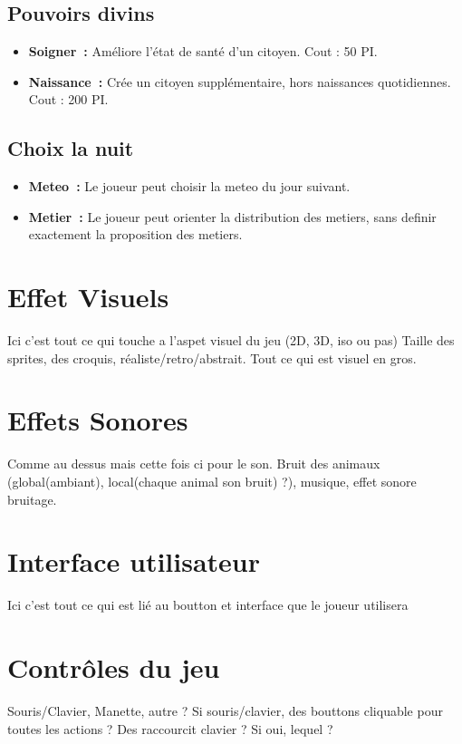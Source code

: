 \documentclass[a4paper]{article}
\begin{document}
\subsection*{Pouvoirs divins}
\begin{itemize}
\item \textbf{Soigner :} \small{ Améliore l'état de santé d'un citoyen. Cout : 50 PI.}
\item \textbf{Naissance :} \small{ Crée un citoyen supplémentaire, hors naissances quotidiennes. Cout : 200 PI.}
\end{itemize}

\subsection*{Choix la nuit}
\begin{itemize}
\item \textbf{Meteo :} \small{ Le joueur peut choisir la meteo du jour suivant.}
\item \textbf{Metier :} \small{ Le joueur peut orienter la distribution des metiers, sans definir exactement la proposition des metiers.}
\end{itemize}


\section*{Effet Visuels}

Ici c'est tout ce qui touche a l'aspet visuel du jeu (2D, 3D, iso ou pas) Taille des sprites, des croquis, réaliste/retro/abstrait. Tout ce qui est visuel en gros.

\section*{Effets Sonores}

Comme au dessus mais cette fois ci pour le son. Bruit des animaux (global(ambiant), local(chaque animal son bruit) ?), musique, effet sonore bruitage.

\section*{Interface utilisateur}

Ici c'est tout ce qui est lié au boutton et interface que le joueur utilisera 

\section*{Contrôles du jeu}

Souris/Clavier, Manette, autre ?
Si souris/clavier, des bouttons cliquable pour toutes les actions ? Des raccourcit clavier ? Si oui, lequel ?
\end{document}
